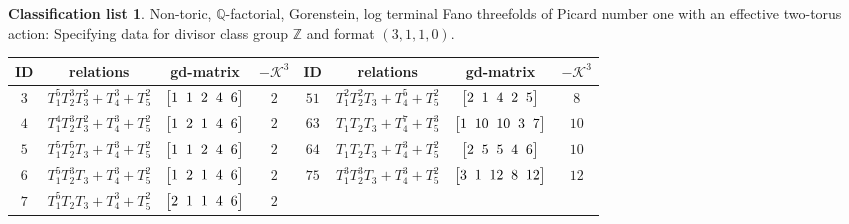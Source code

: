 \documentclass[pdftex]{sigma}%
\theoremstyle{definition}
\newtheorem{class-list}[thm]{Classification list}
\def\ZZ{{\mathbb Z}}
\def\QQ{{\mathbb Q}}
\numberwithin{equation}{section}
\begin{document}
\begin{class-list}
Non-toric, $\QQ$-factorial, Gorenstein, log terminal Fano
threefolds of Picard number one with an effective two-torus action:
Specifying data for divisor class group $\ZZ$ and format $(3,1,1,0)$.
\begin{table}[h!]\centering\setlength{\tabcolsep}{3.5pt}
\renewcommand{\arraystretch}{1.25}\small\tabulinesep=1mm
\begin{tabu}{c|c|c|c||c|c|c|c}\hline
ID&relations&gd-matrix&$-\mathcal{K}^3$&ID&relations&gd-matrix&$-\mathcal{K}^3$
\\ \hline
${3}$&${T_{1}^{5}T_{2}^{3}T_{3}^{2}+T_{4}^{3}+T_{5}^{2}}$
&$\arraycolsep=1mm\begin{bmatrix} {1} & {1} & {2} & {4} & {6}\end{bmatrix}$&${2}$
&${51}$&${T_{1}^{2}T_{2}^{2}T_{3}+T_{4}^{5}+T_{5}^{2}}$
&$\arraycolsep=1mm\begin{bmatrix}{2} & {1} & {4} & {2} & {5}\end{bmatrix}$&${8}$
\\
\hline
${4}$&${T_{1}^{4}T_{2}^{3}T_{3}^{2}+T_{4}^{3}+T_{5}^{2}}$
&$\arraycolsep=1mm\begin{bmatrix}{1} & {2} & {1} & {4} & {6}\end{bmatrix}$&${2}$
&${63}$&${T_{1}T_{2}T_{3}+T_{4}^{7}+T_{5}^{3}}$
&$\arraycolsep=1mm\begin{bmatrix}{1} & {10} & {10} & {3} & {7}\end{bmatrix}$&${10}$
\\ \hline
${5}$&${T_{1}^{5}T_{2}^{5}T_{3}+T_{4}^{3}+T_{5}^{2}}$
&$\arraycolsep=1mm\begin{bmatrix}{1} & {1} & {2} & {4} & {6}\end{bmatrix}$&${2}$
&${64}$&${T_{1}T_{2}T_{3}+T_{4}^{3}+T_{5}^{2}}$
&$\arraycolsep=1mm\begin{bmatrix}{2} & {5} & {5} & {4} & {6}\end{bmatrix}$&${10}$
\\ \hline
${6}$&${T_{1}^{5}T_{2}^{3}T_{3}+T_{4}^{3}+T_{5}^{2}}$
&$\arraycolsep=1mm\begin{bmatrix}{1} & {2} & {1} & {4} & {6}\end{bmatrix}$&${2}$
&${75}$&${T_{1}^{3}T_{2}^{3}T_{3}+T_{4}^{3}+T_{5}^{2}}$
&$\arraycolsep=1mm\begin{bmatrix}{3} & {1} & {12} & {8} & {12}\end{bmatrix}$&${12}$
\\ \hline
${7}$&${T_{1}^{5}T_{2}T_{3}+T_{4}^{3}+T_{5}^{2}}$
&$\arraycolsep=1mm\begin{bmatrix}{2} & {1} & {1} & {4} & {6}\end{bmatrix}$&${2}$

\end{tabu}
\end{table}
\end{class-list}
\end{document}
